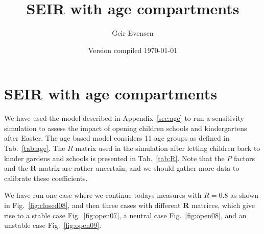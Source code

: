 \documentclass[twoside,11pt]{article}
\newcommand{\bmR}{{\mathbf{R}}}
\begin{document}
\setlength{\parskip}{3mm} 

\title{SEIR with age compartments}
\author{Geir Evensen}

\date{Version compiled \today}

\maketitle

\section{SEIR with age compartments\label{sec:age}}
We have used the model described in Appendix~\ref{sec:age} to run a sensitivity simulation to assess the impact of opening children 
schools and kindergartens after Easter. The age based model considers 11 age groups as defined in Tab.~\ref{tab:age}.
The $R$ matrix used in the simulation after letting children back to kinder gardens and schools is presented in Tab.~\ref{tab:R}.
Note that the $P$ factors and the $\bmR$ matrix are rather uncertain, and we should gather more data to calibrate these coefficients.

We have run one case where we continue todays measures with $R=0.8$ as shown in Fig.~\ref{fig:closed08}, and then three cases with 
different $\bmR$ matrices, which give rise to a stable case Fig.~\ref{fig:open07}, a neutral case Fig.~\ref{fig:open08}, and an unstable case
Fig.~\ref{fig:open09}.
\end{document}
